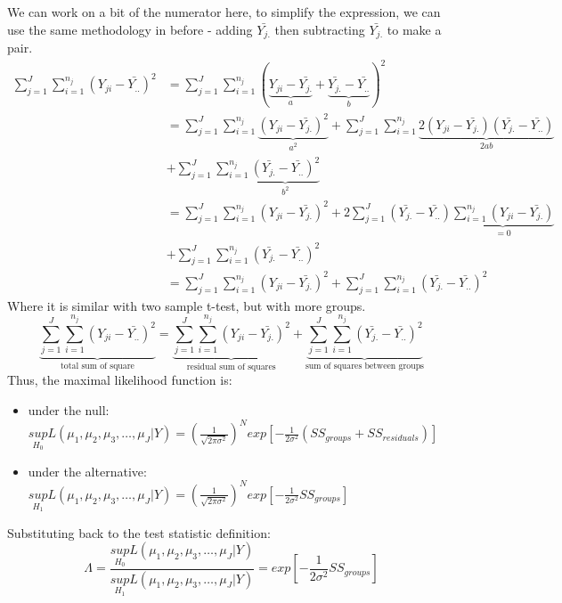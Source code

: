 \documentclass[12pt ]{article}
\begin{document}
We can work on a bit of the numerator here, to simplify the expression, we can use the same methodology in before - adding $\bar{Y_{j.}}$ then subtracting $\bar{Y_{j.}}$ to make a pair.
\begin{align*}
\sum_{j=1}^{J}\sum^{n_{j}}_{i=1} (Y_{ji} - \bar{Y_{..}})^2 &= \sum_{j=1}^{J}\sum^{n_{j}}_{i=1} (\underbrace{Y_{ji} - \bar{Y_{j.}}}_{a} + \underbrace{\bar{Y_{j.}} -\bar{Y_{..}}}_{b})^2 \\
&= \sum_{j=1}^{J}\sum^{n_{j}}_{i=1} \underbrace{(Y_{ji} - \bar{Y_{j.}})^2}_{a^2} + \sum_{j=1}^{J}\sum^{n_{j}}_{i=1} \underbrace{2(Y_{ji} - \bar{Y_{j.}})(\bar{Y_{j.}} -\bar{Y_{..}})}_{2ab} \\
 &+ \sum_{j=1}^{J}\sum^{n_{j}}_{i=1}\underbrace{(\bar{Y_{j.}} -\bar{Y_{..}})^2}_{b^2} \\
 &= \sum_{j=1}^{J}\sum^{n_{j}}_{i=1} (Y_{ji} - \bar{Y_{j.}})^2 + 2 \sum_{j=1}^{J} (\bar{Y_{j.}} -\bar{Y_{..}}) \underbrace{\sum^{n_{j}}_{i=1} (Y_{ji} - \bar{Y_{j.}})}_{=0} \\
 &+ \sum_{j=1}^{J}\sum^{n_{j}}_{i=1} (\bar{Y_{j.}} -\bar{Y_{..}})^2 \\
 &= \sum_{j=1}^{J}\sum^{n_{j}}_{i=1} (Y_{ji} - \bar{Y_{j.}})^2 + \sum_{j=1}^{J}\sum^{n_{j}}_{i=1} (\bar{Y_{j.}} -\bar{Y_{..}})^2
\end{align*}
Where it is similar with two sample t-test, but with more groups.
\begin{equation*}
\underbrace{\sum_{j=1}^{J}\sum^{n_{j}}_{i=1} (Y_{ji} - \bar{Y_{..}})^2}_{\text{total sum of square}} = \underbrace{\sum_{j=1}^{J}\sum^{n_{j}}_{i=1} (Y_{ji} - \bar{Y_{j.}})^2 }_{\text{residual sum of squares}} + \underbrace{\sum_{j=1}^{J}\sum^{n_{j}}_{i=1} (\bar{Y_{j.}} -\bar{Y_{..}})^2}_{\text{sum of squares between groups}}
\end{equation*}
Thus, the maximal likelihood function is:
\begin{itemize}
\item under the null: $\underset{H_{0}}{sup} L( \mu_{1}, \mu_{2}, \mu_{3}, \ldots , \mu_{J}| Y) = (\frac{1}{\sqrt{2 \pi \sigma^2}})^{N} exp[- \frac{1}{2 \sigma^2} (SS_{groups} + SS_{residuals})]$
\item under the alternative: $\underset{H_{1}}{sup} L( \mu_{1}, \mu_{2}, \mu_{3}, \ldots , \mu_{J}| Y) = (\frac{1}{\sqrt{2 \pi \sigma^2}})^{N} exp[- \frac{1}{2 \sigma^2} SS_{groups}]$
\end{itemize}
Substituting back to the test statistic definition:
\begin{equation*}
\Lambda = \frac{\underset{H_{0}}{sup} L( \mu_{1}, \mu_{2}, \mu_{3}, \ldots , \mu_{J}| Y)}{\underset{H_{1}}{sup} L( \mu_{1}, \mu_{2}, \mu_{3}, \ldots , \mu_{J}| Y)} = exp[- \frac{1}{2 \sigma^2} SS_{groups}]
\end{equation*}
\end{document}

